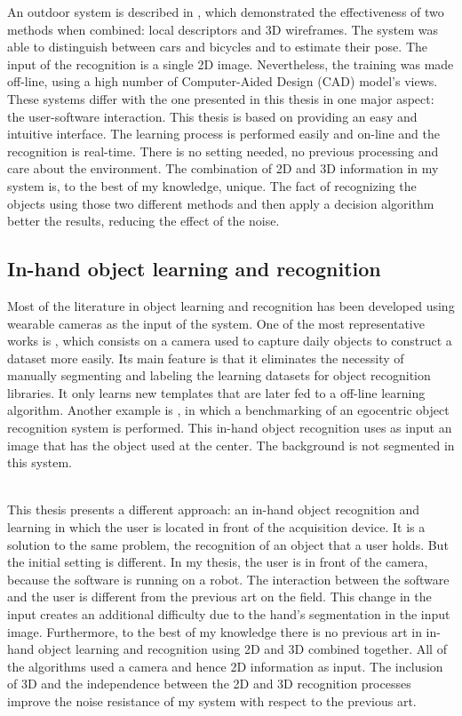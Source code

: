An outdoor system is described in \cite{Zia2013}, which demonstrated the effectiveness of two methods when combined: local descriptors and 3D wireframes. 
The system was able to distinguish between cars and bicycles and to estimate their pose. 
The input of the recognition is a single 2D image. 
Nevertheless, the training was made off-line, using a high number of Computer-Aided Design (CAD) model's views. 
These systems differ with the one presented in this thesis in one major aspect: 
the user-software interaction. 
This thesis is based on providing an easy and intuitive interface. 
The learning process is performed easily and on-line and the recognition is real-time. 
There is no setting needed, no previous processing and care about the environment. 
The combination of 2D and 3D information in my system is, to the best of my knowledge, unique. 
The fact of recognizing the objects using those two different methods and then apply a decision algorithm better the results, reducing the effect of the noise.  



\subsection{In-hand object learning and recognition}

Most of the literature in object learning and recognition has been developed using wearable cameras as the input of the system. 
One of the most representative works is \cite{Roth2006}, which consists on a camera used to capture daily objects to construct a dataset more easily. 
Its main feature is that it eliminates the necessity of manually segmenting and labeling the learning datasets for object recognition libraries. 
It only learns new templates that are later fed to a off-line learning algorithm. 
Another example is \cite{Philipose2009}, in which a benchmarking of an egocentric object recognition system is performed. 
This in-hand object recognition uses as input an image that has the object used at the center. 
The background is not segmented in this system. 

\\

This thesis presents a different approach: an in-hand object recognition and learning in which the user is located in front of the acquisition device. 
It is a solution to the same problem, the recognition of an object that a user holds. 
But the initial setting is different. 
In my thesis, the user is in front of the camera, because the software is running on a robot. 
The interaction between the software and the user is different from the previous art on the field. 
This change in the input creates an additional difficulty due to the hand's segmentation in the input image. 
Furthermore, to the best of my knowledge there is no previous art in in-hand object learning and recognition using 2D and 3D combined together. 
All of the algorithms used a camera and hence 2D information as input. 
The inclusion of 3D and the independence between the 2D and 3D recognition processes improve the noise resistance of my system with respect to the previous art. 


